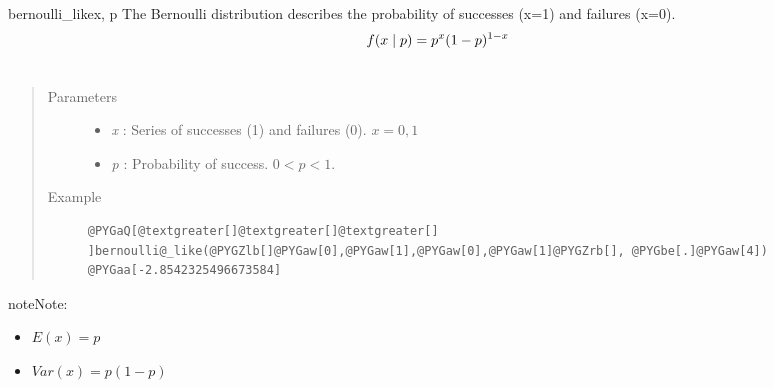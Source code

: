 \hypertarget{pymc.distributions.bernoulli_like}{}\begin{funcdesc}{bernoulli\_like}{x, p}
The Bernoulli distribution describes the probability of successes (x=1) and
failures (x=0).
\begin{gather}
\begin{split}f(x \mid p) = p^{x} (1-p)^{1-x}\end{split}\notag\\\begin{split}\end{split}\notag
\end{gather}\begin{quote}\begin{description}
\item[Parameters] \leavevmode\begin{itemize}
\item {} 
\emph{x} : Series of successes (1) and failures (0). $x=0,1$

\item {} 
\emph{p} : Probability of success. $0 < p < 1$.

\end{itemize}

\item[Example] \leavevmode
\begin{Verbatim}[commandchars=@\[\]]
@PYGaQ[@textgreater[]@textgreater[]@textgreater[] ]bernoulli@_like(@PYGZlb[]@PYGaw[0],@PYGaw[1],@PYGaw[0],@PYGaw[1]@PYGZrb[], @PYGbe[.]@PYGaw[4])
@PYGaa[-2.8542325496673584]
\end{Verbatim}

\end{description}\end{quote}

\begin{notice}{note}{Note:}\begin{itemize}
\item {} 
$E(x)= p$

\item {} 
$Var(x)= p(1-p)$

\end{itemize}
\end{notice}
\end{funcdesc}

